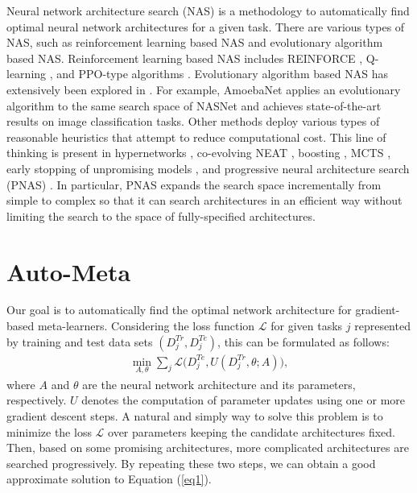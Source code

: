 \documentclass{article}
\begin{document}
Neural network architecture search (NAS) is a methodology to 
automatically find optimal neural network architectures for a given task. There are various 
types of NAS, such as reinforcement learning based NAS and evolutionary algorithm based NAS. 
Reinforcement learning based NAS includes REINFORCE \cite{zoph:rl_nas_google:DBLP:journals/corr/ZophL16}, 
Q-learning \cite{zhong:q_learning_nas:DBLP:journals/corr/abs-1708-05552, baker:rl_nas:DBLP:journals/corr/BakerGNR16}, 
and PPO-type algorithms \cite{zoph:nasnet_google:DBLP:journals/corr/ZophVSL17}. Evolutionary algorithm based NAS has extensively been explored in \cite{real:large_scale_nas_google:DBLP:conf/icml/RealMSSSTLK17,
miikkulainen:evolv_nas:DBLP:journals/corr/MiikkulainenLMR17, xie:genetic_cnn:DBLP:conf/iccv/XieY17, 
liu:hier_nas:DBLP:journals/corr/abs-1711-00436,
real:amoebanet_reg_nas:DBLP:journals/corr/abs-1802-01548}.
For example, AmoebaNet \cite{real:large_scale_nas_google:DBLP:conf/icml/RealMSSSTLK17} applies an evolutionary
algorithm to the same search space of NASNet and achieves state-of-the-art results on image classification tasks.
Other methods deploy various types of reasonable heuristics that attempt to reduce computational cost. 
This line of thinking is present in hypernetworks \cite{brock:smash:DBLP:journals/corr/abs-1708-05344}, co-evolving NEAT \cite{miikkulainen:evolv_nas:DBLP:journals/corr/MiikkulainenLMR17}, boosting \cite{cortes:adanet:DBLP:conf/icml/CortesGKMY17,  huang:boost_nas:DBLP:journals/corr/HuangALS17}, MCTS \cite{negrinho:deeparch:DBLP:journals/corr/NegrinhoG17}, early stopping of unpromising models \cite{baker:nas_perf_pred:DBLP:journals/corr/BakerGRN17}, and progressive neural architecture 
search (PNAS) \cite{liu:pnas_google:DBLP:journals/corr/abs-1712-00559}.
In particular, PNAS expands the search space incrementally from simple to complex so that it can search architectures in an efficient way without limiting the search to the space of fully-specified architectures.
\section{Auto-Meta}
Our goal is to automatically find the optimal network architecture for gradient-based meta-learners. Considering the loss function $\mathcal{L}$ for given tasks $j$ represented by training and test data sets $(D_{j}^{Tr},D_{j}^{Te})$, this can be formulated as follows:
\begin{eqnarray}
\min_{A,\theta} \sum_{j} \mathcal{L} \big (D_{j}^{Te}, U(D_{j}^{Tr},\theta;A) \big ),
\label{eq1}
\end{eqnarray}
where $A$ and $\theta$ are the neural network architecture and its parameters, respectively. $U$ denotes the computation of parameter updates using one or more gradient descent steps.
A natural and simply way to solve this problem is to minimize the loss $\mathcal{L}$ over parameters keeping the candidate architectures fixed. Then, based on some promising architectures, more complicated architectures are searched progressively. By repeating these two steps, we can obtain a good approximate solution to Equation (\ref{eq1}).
\end{document}
